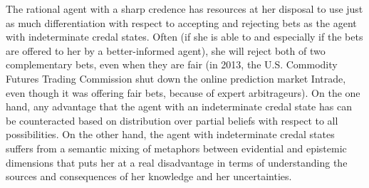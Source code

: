 The rational agent with a sharp credence has resources
at her disposal to use just as much differentiation
with respect to accepting and rejecting bets as the
agent with indeterminate credal states. Often (if she
is able to and especially if the bets are offered to
her by a better-informed agent), she will reject both
of two complementary bets, even when they are fair (in
2013, the U.S. Commodity Futures Trading Commission
shut down the online prediction market Intrade, even
though it was offering fair bets, because of expert
arbitrageurs). On the one hand, any advantage that the
agent with an indeterminate credal state has can be
counteracted based on distribution over partial beliefs
with respect to all possibilities. On the other hand,
the agent with indeterminate credal states suffers from
a semantic mixing of metaphors between evidential and
epistemic dimensions that puts her at a real
disadvantage in terms of understanding the sources and
consequences of her knowledge and her uncertainties.

